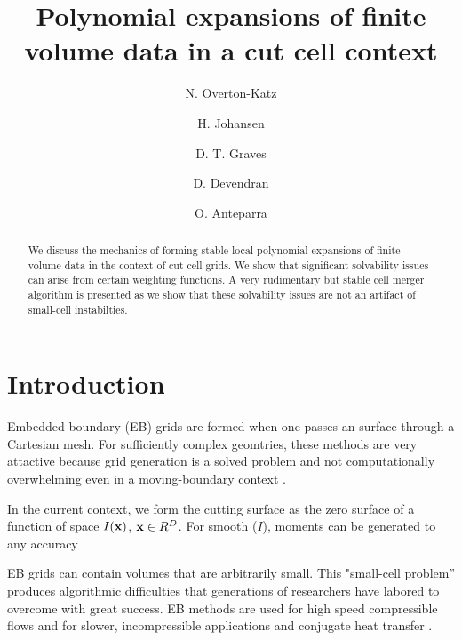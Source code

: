 \documentclass{article}
\newcommand{\xbold}{{\bf x}}
\begin{document}
\title{Polynomial expansions of finite volume data in a cut cell context}
\author{N. Overton-Katz \footnotemark[1]
   \and H. Johansen     \footnotemark[1]
   \and D. T. Graves    \footnotemark[1]
   \and D. Devendran    \footnotemark[2]
   \and O. Anteparra    \footnotemark[1]}

\maketitle

\begin{abstract}

  We discuss the mechanics of forming stable local polynomial
  expansions of finite volume data in the context of cut cell grids.
  We show that significant solvability issues can arise from certain weighting
  functions.    A very rudimentary but stable cell merger algorithm is
  presented as we show that these solvability issues are not 
  an artifact of small-cell instabilties.
  
\end{abstract}


\section{Introduction}

Embedded boundary (EB) grids are formed when one passes an  surface
through a Cartesian mesh.    For sufficiently complex geomtries, these methods
are very attactive because grid generation is a solved problem
and not computationally overwhelming even in a moving-boundary context
\cite{MillerTrebotich2012}.

In the current context, we form the cutting surface as the zero
surface of a function  of space $I(\xbold)$, $\xbold \in R^D$.
For smooth ($I$),  moments can be generated to any
accuracy \cite{Schwartz2015}.

EB grids can contain volumes that are arbitrarily small.    This
"small-cell problem'' produces
algorithmic difficulties that generations of researchers have labored
to overcome with great success.   EB methods are used for high speed
compressible flows \cite{Colella2006, Graves2013} and for
slower, incompressible applications \cite{Trebotich2015} and conjugate
heat transfer \cite{Crockett2010}.
\end{document}
